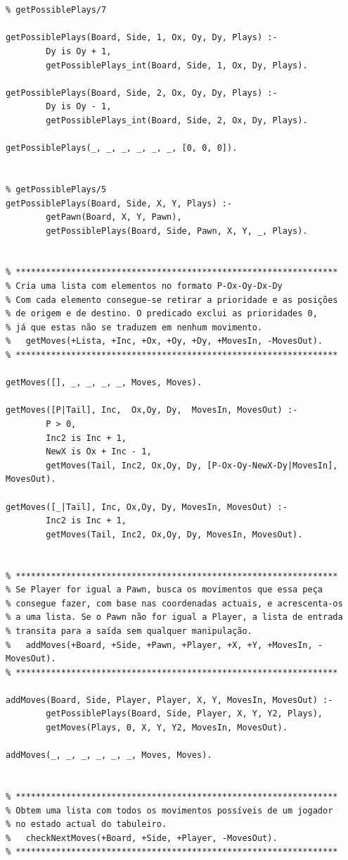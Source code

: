 \documentclass[15pt,a4paper]{article}
\begin{document}
\begin{lstlisting}
		
		
% getPossiblePlays/7		

getPossiblePlays(Board, Side, 1, Ox, Oy, Dy, Plays) :-
		Dy is Oy + 1,
		getPossiblePlays_int(Board, Side, 1, Ox, Dy, Plays).
		
getPossiblePlays(Board, Side, 2, Ox, Oy, Dy, Plays) :-
		Dy is Oy - 1,
		getPossiblePlays_int(Board, Side, 2, Ox, Dy, Plays).
		
getPossiblePlays(_, _, _, _, _, _, [0, 0, 0]).
		

% getPossiblePlays/5
getPossiblePlays(Board, Side, X, Y, Plays) :-
		getPawn(Board, X, Y, Pawn),
		getPossiblePlays(Board, Side, Pawn, X, Y, _, Plays).
		

% ****************************************************************
% Cria uma lista com elementos no formato P-Ox-Oy-Dx-Dy
% Com cada elemento consegue-se retirar a prioridade e as posições
% de origem e de destino. O predicado exclui as prioridades 0,
% já que estas não se traduzem em nenhum movimento.
%	getMoves(+Lista, +Inc, +Ox, +Oy, +Dy, +MovesIn, -MovesOut).
% ****************************************************************

getMoves([], _, _, _, _, Moves, Moves).

getMoves([P|Tail], Inc,  Ox,Oy, Dy,  MovesIn, MovesOut) :-
		P > 0,
		Inc2 is Inc + 1,
		NewX is Ox + Inc - 1,
		getMoves(Tail, Inc2, Ox,Oy, Dy, [P-Ox-Oy-NewX-Dy|MovesIn], MovesOut).			

getMoves([_|Tail], Inc, Ox,Oy, Dy, MovesIn, MovesOut) :-
		Inc2 is Inc + 1,
		getMoves(Tail, Inc2, Ox,Oy, Dy, MovesIn, MovesOut).
		
		
% ****************************************************************
% Se Player for igual a Pawn, busca os movimentos que essa peça
% consegue fazer, com base nas coordenadas actuais, e acrescenta-os
% a uma lista. Se o Pawn não for igual a Player, a lista de entrada
% transita para a saída sem qualquer manipulação.
%	addMoves(+Board, +Side, +Pawn, +Player, +X, +Y, +MovesIn, -MovesOut).
% ****************************************************************
	
addMoves(Board, Side, Player, Player, X, Y, MovesIn, MovesOut) :-
		getPossiblePlays(Board, Side, Player, X, Y, Y2, Plays),
		getMoves(Plays, 0, X, Y, Y2, MovesIn, MovesOut).

addMoves(_, _, _, _, _, _, Moves, Moves).		


% ****************************************************************
% Obtem uma lista com todos os movimentos possíveis de um jogador
% no estado actual do tabuleiro.
%	checkNextMoves(+Board, +Side, +Player, -MovesOut).
% ****************************************************************


\end{lstlisting}
\end{document}
